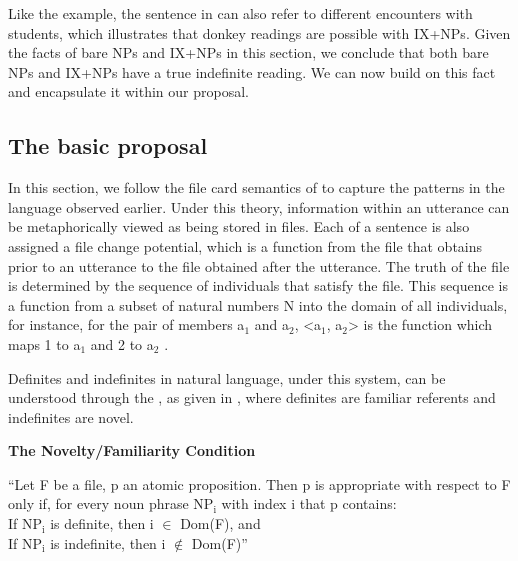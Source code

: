 \documentclass[output=paper,
modfonts
]{langscibook}
\begin{document}
Like the  example, the sentence in  can also refer to different encounters with students, which illustrates that donkey readings are possible with IX+NPs. Given the facts of bare NPs and IX+NPs in this section, we conclude that both bare NPs and IX+NPs have a true indefinite reading. We can now build on this fact and encapsulate it within our proposal. 

\subsection{The basic proposal}\label{sec:irani:4.2} 

In this section, we follow the file card semantics of \citet{Heim1983} to capture the patterns in the language observed earlier. Under this theory, information within an utterance can be metaphorically viewed as being stored in files. Each  of a sentence is also assigned a file change potential, which is a function from the file that obtains prior to an utterance to the file obtained after the utterance. The truth of the file is determined by the sequence of individuals that satisfy the file. This sequence is a function from a subset of natural numbers N into the domain of all individuals, for instance, for the pair of members a$_{1}$ and a$_{2}$, <a$_{1}$, a$_{2}$> is the function which maps 1 to a$_{1}$ and 2 to a$_{2}$ \cite[228]{Heim1983}. 


Definites and indefinites in natural language, under this system, can be understood through the , as given in , where definites are familiar referents and indefinites are novel.

\begin{exe}
\ex \label{ex:irani:42} \textbf{The Novelty/Familiarity Condition}

``Let F be a file, p an atomic proposition. Then p is appropriate with respect to F only if, for every noun phrase NP$_\text{i}$ with index i that p contains:\\
\indent 	If NP$_\text{i}$ is definite, then i \(\in\) Dom(F), and \\
\indent 	If NP$_\text{i}$ is indefinite, then i \(\notin\) Dom(F)'' \cite[233]{Heim1983} 
\end{exe}
\end{document}
